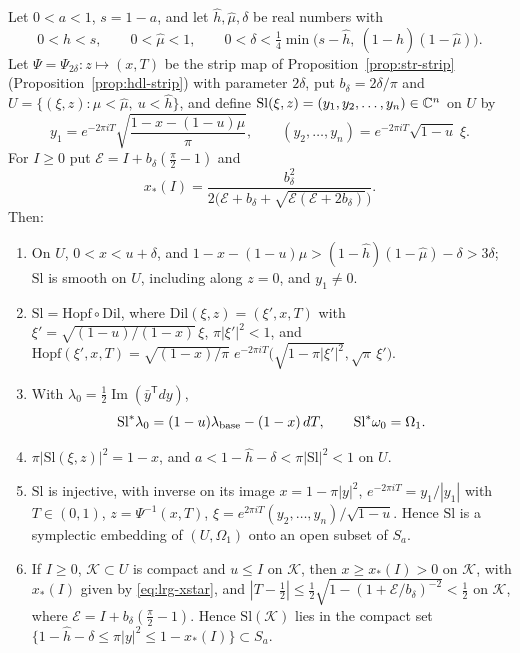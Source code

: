 \begin{lemma}\label{lem:two-slit}\label{lem:lrg-slit}
Let $0<a<1$, $s=1-a$, and let $\hat h,\hat\mu,\delta$ be real numbers with
\[
 0<\hat h<s,\qquad 0<\hat\mu<1,\qquad 0<\delta<\tfrac14\min\bigl(s-\hat h,\ (1-\hat h)(1-\hat\mu)\bigr).
\]
Let $\Psi=\Psi_{2\delta}\colon z\mapsto(x,T)$ be the strip map of Proposition~\ref{prop:str-strip}
(Proposition~\ref{prop:hdl-strip}) with parameter $2\delta$, put $b_\delta=2\delta/\pi$ and $U=\{(\xi,z):\mu<\hat\mu,\ u<\hat h\}$,
and define $\mathrm{Sl}(\xi,z)=(y_1,y_2,\dots,y_n)\in\mathbb{C}^n$ on $U$ by
\begin{equation}\label{eq:lrg-slit}
 y_1=e^{-2\pi iT}\sqrt{\frac{1-x-(1-u)\mu}{\pi}},\qquad
 (y_2,\dots,y_n)=e^{-2\pi iT}\sqrt{1-u}\;\xi .
\end{equation}
For $I\ge0$ put $\mathcal E=I+b_\delta(\frac\pi2-1)$ and
\begin{equation}\label{eq:lrg-xstar}
 x_*(I)=\frac{b_\delta^2}{2\bigl(\mathcal E+b_\delta+\sqrt{\mathcal E(\mathcal E+2b_\delta)}\bigr)}.
\end{equation}
Then:
\begin{enumerate}[label=(\roman*)]
\item On $U$, $0<x<u+\delta$, and $1-x-(1-u)\mu>(1-\hat h)(1-\hat\mu)-\delta>3\delta$; $\mathrm{Sl}$ is smooth on $U$,
including along $z=0$, and $y_1\ne0$.
\item $\mathrm{Sl}=\mathrm{Hopf}\circ\mathrm{Dil}$, where $\mathrm{Dil}(\xi,z)=(\xi',x,T)$ with $\xi'=\sqrt{(1-u)/(1-x)}\,\xi$, $\pi|\xi'|^2<1$, and
$\mathrm{Hopf}(\xi',x,T)=\sqrt{(1-x)/\pi}\;e^{-2\pi iT}\bigl(\sqrt{1-\pi|\xi'|^2},\sqrt\pi\,\xi'\bigr)$.
\item With $\lambda_0=\frac12\operatorname{Im}(\bar y^{\mathsf T}dy)$,
\[
 \mathrm{Sl}^*\lambda_0=(1-u)\lambda_{\rm base}-(1-x)\,dT,\qquad \mathrm{Sl}^*\omega_0=\Omega_1 .
\]
\item $\pi|\mathrm{Sl}(\xi,z)|^2=1-x$, and $a<1-\hat h-\delta<\pi|\mathrm{Sl}|^2<1$ on $U$.
\item $\mathrm{Sl}$ is injective, with inverse on its image $x=1-\pi|y|^2$, $e^{-2\pi iT}=y_1/|y_1|$ with $T\in(0,1)$,
$z=\Psi^{-1}(x,T)$, $\xi=e^{2\pi iT}(y_2,\dots,y_n)/\sqrt{1-u}$. Hence $\mathrm{Sl}$ is a symplectic embedding of $(U,\Omega_1)$ onto an open
subset of $S_a$.
\item If $I\ge0$, $\mathcal K\subset U$ is compact and $u\le I$ on $\mathcal K$, then $x\ge x_*(I)>0$ on $\mathcal K$, with $x_*(I)$ given by
\eqref{eq:lrg-xstar}, and $|T-\frac12|\le\frac12\sqrt{1-(1+\mathcal E/b_\delta)^{-2}}<\frac12$ on $\mathcal K$, where
$\mathcal E=I+b_\delta(\frac\pi2-1)$. Hence $\mathrm{Sl}(\mathcal K)$ lies in the compact set $\{1-\hat h-\delta\le\pi|y|^2\le1-x_*(I)\}\subset S_a$.
\end{enumerate}
\end{lemma}

